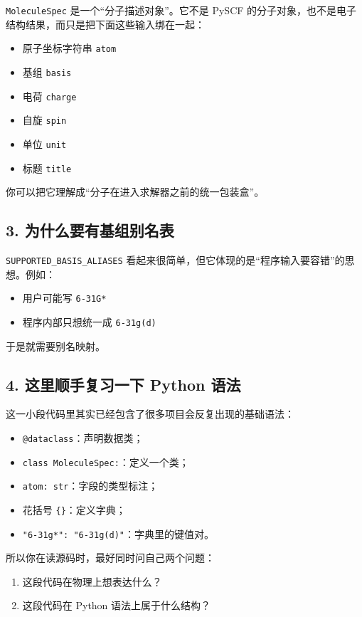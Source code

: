 \documentclass[UTF8,11pt,fontset=fandol]{ctexbook}
\begin{document}
\texttt{MoleculeSpec} 是一个“分子描述对象”。它不是 PySCF 的分子对象，也不是电子结构结果，而只是把下面这些输入绑在一起：
\begin{itemize}
  \item 原子坐标字符串 \texttt{atom}
  \item 基组 \texttt{basis}
  \item 电荷 \texttt{charge}
  \item 自旋 \texttt{spin}
  \item 单位 \texttt{unit}
  \item 标题 \texttt{title}
\end{itemize}

你可以把它理解成“分子在进入求解器之前的统一包装盒”。

\subsection*{3. 为什么要有基组别名表}

\texttt{SUPPORTED\_BASIS\_ALIASES} 看起来很简单，但它体现的是“程序输入要容错”的思想。例如：
\begin{itemize}
  \item 用户可能写 \texttt{6-31G*}
  \item 程序内部只想统一成 \texttt{6-31g(d)}
\end{itemize}

于是就需要别名映射。

\subsection*{4. 这里顺手复习一下 Python 语法}

这一小段代码里其实已经包含了很多项目会反复出现的基础语法：
\begin{itemize}
  \item \texttt{@dataclass}：声明数据类；
  \item \texttt{class MoleculeSpec:}：定义一个类；
  \item \texttt{atom: str}：字段的类型标注；
  \item 花括号 \texttt{\{\}}：定义字典；
  \item \texttt{"6-31g*": "6-31g(d)"}：字典里的键值对。
\end{itemize}

所以你在读源码时，最好同时问自己两个问题：
\begin{enumerate}[label=\arabic*.]
  \item 这段代码在物理上想表达什么？
  \item 这段代码在 Python 语法上属于什么结构？
\end{enumerate}
\end{document}

